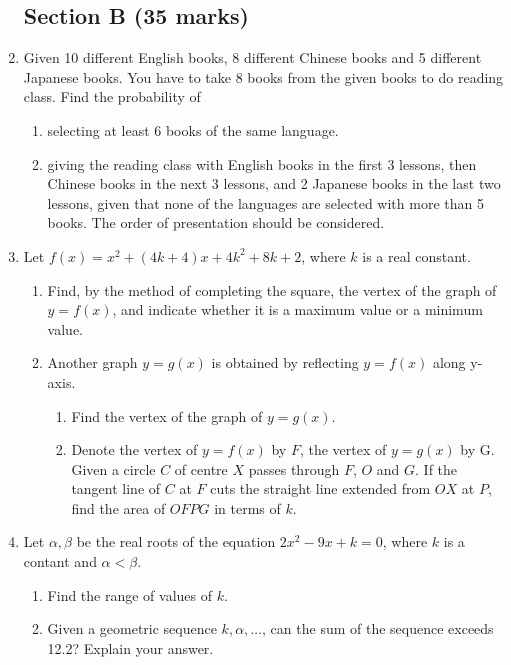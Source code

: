 \documentclass[12pt]{article}
\begin{document}
\begin{enumerate}
        \subsection*{Section B (35 marks)}
        \item Given 10 different English books, 8 different Chinese books and 5 different Japanese books. You have to take 8 books from the given books to do reading class. Find the probability of\begin{enumerate}
            \item selecting at least 6 books of the same language.
            \item giving the reading class with English books in the first 3 lessons, then Chinese books in the next 3 lessons, and 2 Japanese books in the last two lessons, given that none of the languages are selected with more than 5 books. The order of presentation should be considered.
        \end{enumerate}

        \item Let $f(x)=x^2+(4k+4)x+4k^2+8k+2$, where $k$ is a real constant.\begin{enumerate}
            \item Find, by the method of completing the square, the vertex of the graph of $y=f(x)$, and indicate whether it is a maximum value or a minimum value.
            \item Another graph $y=g(x)$ is obtained by reflecting $y=f(x)$ along y-axis.\begin{enumerate}
                \item Find the vertex of the graph of $y=g(x)$.
                \item Denote the vertex of $y=f(x)$ by $F$, the vertex of $y=g(x)$ by G. Given a circle $C$ of centre $X$ passes through $F$, $O$ and $G$. If the tangent line of $C$ at $F$ cuts the straight line extended from $OX$ at $P$, find the area of $OFPG$ in terms of $k$.
            \end{enumerate}
        \end{enumerate}

        \item Let $\alpha,\beta$ be the real roots of the equation $2x^2-9x+k=0$, where $k$ is a contant and $\alpha<\beta$. \begin{enumerate}
            \item Find the range of values of $k$.
            \item Given a geometric sequence $k, \alpha, \dots$, can the sum of the sequence exceeds 12.2? Explain your answer.
        \end{enumerate}
    \end{enumerate}
\end{document}
